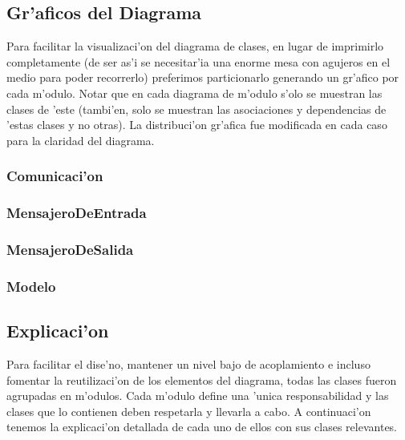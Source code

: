 \subsection{Gr'aficos del Diagrama}
Para facilitar la visualizaci'on del diagrama de clases, en lugar de imprimirlo completamente (de ser as'i se necesitar'ia una enorme mesa con agujeros en el medio para poder recorrerlo) preferimos particionarlo generando un gr'afico por cada m'odulo. Notar que en cada diagrama de m'odulo s'olo se muestran las clases de 'este (tambi'en, solo se muestran las asociaciones y dependencias de 'estas clases y no otras). La distribuci'on gr'afica fue modificada en cada caso para la claridad del diagrama.
\clearpage


\subsubsection{Comunicaci'on}
\clearpage

\subsubsection{MensajeroDeEntrada}
\clearpage

\subsubsection{MensajeroDeSalida}
\clearpage

\subsubsection{Modelo}
\clearpage



\clearpage



\subsection{Explicaci'on}
Para facilitar el dise'no, mantener un nivel bajo de acoplamiento e incluso fomentar la reutilizaci'on de los elementos del diagrama, todas las clases fueron agrupadas en m'odulos. Cada m'odulo define una 'unica responsabilidad y las clases que lo contienen deben respetarla y llevarla a cabo. A continuaci'on tenemos la explicaci'on detallada de cada uno de ellos con sus clases relevantes.


